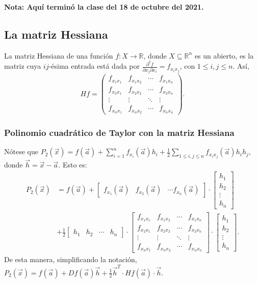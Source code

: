 \documentclass{article}
\begin{document}
\vspace{10pt}
\textbf{Nota: Aquí terminó la clase del 18 de octubre del 2021.}

\subsection*{La matriz Hessiana}

La matriz Hessiana de una función $f:X\to\mathbb{R}$, donde $X\subseteq\mathbb{R}^n$ es un abierto, es la matriz cuya $ij$-ésima entrada está dada por $\displaystyle\frac{\partial^2f}{\partial x_j\partial x_i}=f_{x_ix_j}$, con $1\leq i,j\leq n$. Así,
$$Hf=\begin{pmatrix}
f_{x_1x_1} & f_{x_1x_2} & \cdots & f_{x_1x_n}\\
f_{x_2x_1} & f_{x_2x_2} & \cdots & f_{x_2x_n}\\
\vdots & \vdots & \ddots & \vdots\\
f_{x_nx_1} & f_{x_nx_2} & \cdots & f_{x_nx_n}
\end{pmatrix}.$$

\subsubsection*{Polinomio cuadrático de Taylor con la matriz Hessiana}

Nótese que $P_2(\vec{x})=f(\vec{a})+\displaystyle\sum_{i=1}^nf_{x_i}(\vec{a})h_i+\frac{1}{2}\sum_{1\leq i,j\leq n} f_{x_ix_j}(\vec{a})h_ih_j$, donde $\vec{h}=\vec{x}-\vec{a}$. Esto es:
\begin{align*}
P_2(\vec{x})&=f(\vec{a})+
\begin{bmatrix}
f_{x_1}(\vec{a}) &  f_{x_2}(\vec{a}) & \cdots f_{x_n}(\vec{a})
\end{bmatrix}\cdot\begin{bmatrix}
h_1\\ h_2\\ \vdots \\ h_n
\end{bmatrix}\\
&+\frac{1}{2}\begin{bmatrix}
h_1& h_2& \cdots & h_n
\end{bmatrix}\cdot\begin{bmatrix}
f_{x_1x_1} & f_{x_1x_2} & \cdots & f_{x_1x_n}\\
f_{x_2x_1} & f_{x_2x_2} & \cdots & f_{x_2x_n}\\
\vdots & \vdots & \ddots & \vdots\\
f_{x_nx_1} & f_{x_nx_2} & \cdots & f_{x_nx_n}
\end{bmatrix}\cdot\begin{bmatrix}
h_1\\ h_2\\ \vdots \\ h_n
\end{bmatrix}.
\end{align*}
De esta manera, simplificando la notación, $P_2(\vec{x})=f(\vec{a})+Df(\vec{a})\vec{h}+\displaystyle\frac{1}{2}\vec{h}^T\cdot Hf(\vec{a})\cdot\vec{h}$.
\end{document}
